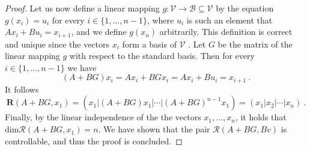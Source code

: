 \begin{proof}
    Let us now define a linear mapping $g\colon\mathcal{V}\to\mathcal{B}\subseteq \mathcal{V}$ by the equation $g(x_i)=u_i$ for every $i\in\{1,\dots,n-1\}$, where $u_i$ is  such an element that $Ax_i+Bu_i=x_{i+1}$, and we define $g(x_n)$ arbitrarily. This definition is correct and unique since the vectors $x_i$ form a basis of $\mathcal{V}$ \citep[see][Tvrzení 6.4]{Barto}. Let $G$ be the matrix of the linear mapping $g$ with respect to the standard basis. Then for every $i\in\{1,\ldots,n-1\}$ we have
    $$(A+BG)x_i=Ax_i+BGx_i=Ax_i+Bu_i=x_{i+1}\ .$$
    It follows 
    $$\mathbf{R}(A+BG,x_1)=(x_1|(A+BG)x_1|\cdots|(A+BG)^{n-1}x_1)=(x_1|x_2|\cdots|x_n)\ .$$
    Finally, by the linear independence of the the vectors $x_1,\ldots,x_n$, it holds that $\text{dim}\mathcal{R}(A+BG,x_1)=n$. We have shown that the pair $\mathcal{R}(A+BG,Bv)$ is controllable, and thus the proof is concluded.
\end{proof}